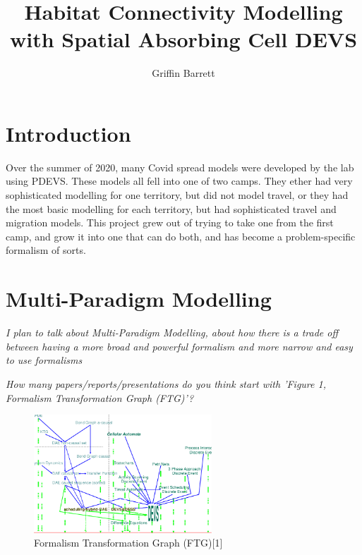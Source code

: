 \documentclass[twocolumn]{article}
\title{Habitat Connectivity Modelling with Spatial Absorbing Cell DEVS}
\author{Griffin Barrett}
\begin{document}
\clearpage
\section{Introduction}

Over the summer of 2020, many Covid spread models were developed by the lab using PDEVS. These models all fell into one of two camps. They ether had very sophisticated modelling for one territory, but did not model travel, or they had the most basic modelling for each territory, but had sophisticated travel and migration models. This project grew out of trying to take one from the first camp, and grow it into one that can do both, and has become a problem-specific formalism of sorts.

\section{Multi-Paradigm Modelling}

\FloatBarrier

\textit{I plan to talk about Multi-Paradigm Modelling, about how there is a trade off between having a more broad and powerful formalism and more narrow and easy to use formalisms}


\textit{How many papers/reports/presentations do you think start with 'Figure 1, Formalism Transformation Graph (FTG)'?}



\begin{figure}[h!]
	\begin{center}
		\includegraphics[width=18em]{Formalism-Transformation-Graph-FTG.png}
		\caption{Formalism Transformation Graph (FTG)[1]}
		\label{fig:ftg}
	\end{center}
\end{figure}
\end{document}
